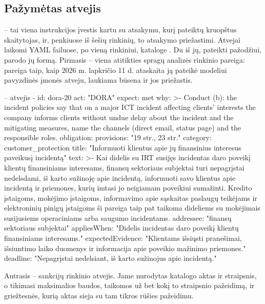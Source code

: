\subsection{Pažymėtas atvejis}\label{sec:control:case}

 -- tai viena instrukcijos įvestis kartu su atsakymu, kurį pateiktų
kruopštus skaitytojas, ir, penkiuose iš šešių rinkinių, to atsakymo priežastimi. Atvejai
laikomi YAML failuose, po vieną rinkiniui, kataloge . Du iš jų,
pateikti pažodžiui, parodo jų formą. Pirmasis -- viena atitikties spragų analizės rinkinio
pareiga: pareiga taip, kaip 2026 m. lapkričio 11 d. ataskaita ją pateikė modeliui pavyzdinės
įmonės atveju, laukiama būsena ir jos priežastis.

\begin{codefile}{ -- atvejis }
  - id: dora-20
    act: "DORA"
    expect: met
    why: >-
      Conduct (b): the incident policies say that on a major ICT incident
      affecting clients' interests the company informs clients without undue
      delay about the incident and the mitigating measures, name the channels
      (direct email, status page) and the responsible roles.
    obligation:
      provisions: "19 str., 23 str."
      category: customer_protection
      title: "Informuoti klientus apie jų finansinius interesus paveikusį incidentą"
      text: >-
        Kai didelis su IRT susijęs incidentas daro poveikį klientų
        finansiniams interesams, finansų sektoriaus subjektai turi nepagrįstai
        nedelsdami, iš karto sužinoję apie incidentą, informuoti savo klientus
        apie incidentą ir priemones, kurių imtasi jo neigiamam poveikiui
        sumažinti. Kredito įstaigoms, mokėjimo įstaigoms, informavimo apie
        sąskaitas paslaugų teikėjams ir elektroninių pinigų įstaigoms ši
        pareiga taip pat taikoma dideliems su mokėjimais susijusiems
        operaciniams arba saugumo incidentams.
      addressee: "finansų sektoriaus subjektai"
      appliesWhen: "Didelis incidentas daro poveikį klientų finansiniams interesams."
      expectedEvidence: "Klientams išsiųsti pranešimai, išsiuntimo laiko duomenys ir informacija apie poveikio mažinimo priemones."
      deadline: "Nepagrįstai nedelsiant, iš karto sužinojus apie incidentą."
\end{codefile}

Antrasis -- sankcijų rinkinio atvejis. Jame nurodytas katalogo aktas ir straipsnis, o
tikimasi maksimalios baudos, taikomos už bet kokį to straipsnio pažeidimą, ir griežtesnės,
kurią aktas sieja su tam tikros rūšies pažeidimu.

